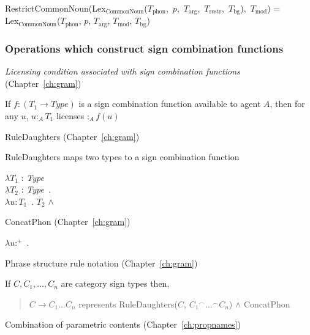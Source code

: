\mbox{RestrictCommonNoun(Lex$_{\mathrm{CommonNoun}}$($T_{\mathrm{phon}}$,
$p$, $T_{\mathrm{arg}}$, $T_{\mathrm{restr}}$, $T_{\mathrm{bg}}$),
$T_{\mathrm{mod}}$)} = \\
Lex$_{\mathrm{CommonNoun}}$($T_{\mathrm{phon}}$,
$p$, $T_{\mathrm{arg}}$, $T_{\mathrm{mod}}$, $T_{\mathrm{bg}}$)  



\subsubsection{Operations which construct sign combination functions}
\label{app:signcomb}

\textit{Licensing condition associated with sign combination
  functions} (Chapter~\ref{ch:gram})

If $f:(T_1\rightarrow Type)$ is a sign combination function available to agent $A$, then for
any $u$, $u :_A T_1$ licenses $:_A f(u)$


RuleDaughters (Chapter~\ref{ch:gram})

RuleDaughters maps two types to a sign combination function

$\lambda T_1$ : \textit{Type} \\
\hspace*{1em} $\lambda T_2$ : \textit{Type}\ . \\
\hspace*{2em} $\lambda u : T_1$\ . $T_2$ \d{$\wedge$}

ConcatPhon (Chapter~\ref{ch:gram})

$\lambda
u$:$^+$\
. \\
\hspace*{1em}


Phrase structure rule notation (Chapter~\ref{ch:gram})

If $C,C_1,\ldots,C_n$ are category sign types then,
\begin{quote}
$C \longrightarrow C_1 \ldots C_n$ represents RuleDaughters($C$,
${C_1}^{\frown}\ldots^{\frown}C_n$) \d{\d{$\wedge$}} ConcatPhon
\end{quote}

Combination of parametric contents (Chapter~\ref{ch:propnames})

